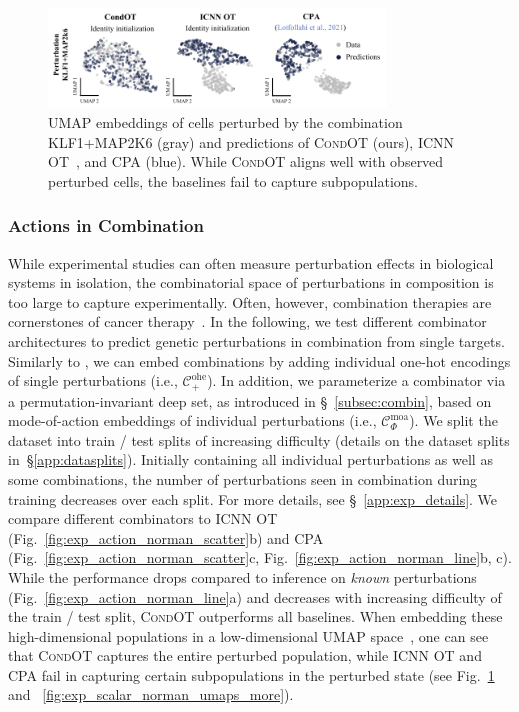  \begin{figure}
    \centering
    \includegraphics[width=0.8\textwidth]{figures/fig_action_comb_comparison_umap.pdf}
    \caption{ UMAP embeddings of cells perturbed by the combination KLF1+MAP2K6 (gray) and predictions of \textsc{CondOT} (ours), \textsc{ICNN OT}~\citep{makkuva2020optimal}, and \textsc{CPA} (blue). While \textsc{CondOT} aligns well with observed perturbed cells, the baselines fail to capture subpopulations.}
    \label{fig:action_comb_comparison_umap}
\end{figure}
 

\subsubsection{Actions in Combination} \label{sec:eval_action_comb}
\vspace{-5pt}

 While experimental studies can often measure perturbation effects in biological systems in isolation, the combinatorial space of perturbations in composition is too large to capture experimentally. Often, however, combination therapies are cornerstones of cancer therapy~\citep{mokhtari2017combination}.
In the following, we test different combinator architectures to predict genetic perturbations in combination from single targets.
Similarly to \citet{lotfollahi2021compositional}, we can embed combinations by adding individual one-hot encodings of single perturbations (i.e., $\mathcal{C}^\text{ohe}_+$). In addition, we parameterize a combinator via a permutation-invariant deep set, as introduced in \S~\ref{subsec:combin}, based on mode-of-action embeddings of individual perturbations (i.e., $\mathcal{C}^\text{moa}_\Phi$). 
We split the dataset into train / test splits of increasing difficulty (details on the dataset splits in~\S\ref{app:datasplits}). Initially containing all individual perturbations as well as some combinations, the number of perturbations seen in combination during training decreases over each split. For more details, see \S~\ref{app:exp_details}.
We compare different combinators to \textsc{ICNN OT} (Fig.~\ref{fig:exp_action_norman_scatter}b) and \textsc{CPA}~\citep{lotfollahi2021compositional} (Fig.~\ref{fig:exp_action_norman_scatter}c, Fig.~\ref{fig:exp_action_norman_line}b, c). While the performance drops compared to inference on \emph{known} perturbations (Fig.~\ref{fig:exp_action_norman_line}a) and decreases with increasing difficulty of the train / test split, \textsc{CondOT} outperforms all baselines.
When embedding these high-dimensional populations in a low-dimensional UMAP space~\citep{umap}, one can see that \textsc{CondOT} captures the entire perturbed population, while \textsc{ICNN OT} and \textsc{CPA} fail in capturing certain subpopulations in the perturbed state (see Fig.~\ref{fig:action_comb_comparison_umap} and ~\ref{fig:exp_scalar_norman_umaps_more}).


